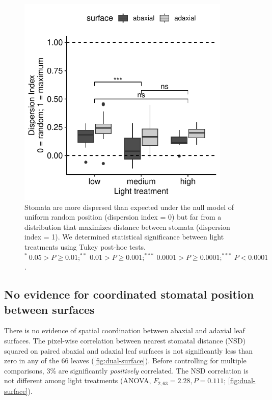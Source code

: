 \documentclass[webpdf,large,modern,unnumsec,namedate]{oup-authoring-template}
\begin{document}
\begin{figure}[ht]
\includegraphics[width=4in]{figures/single-surface.pdf}
\caption{Stomata are more dispersed than expected under the null model of uniform random position (dispersion index = 0) but far from a distribution that maximizes distance between stomata (dispersion index = 1). We determined statistical significance between light treatments using Tukey post-hoc tests. $^*~0.05 > P \ge 0.01; ^{**}~0.01 > P \ge 0.001; ^{***}~0.0001 > P \ge 0.0001; ^{***}~ P <0.0001$.}
\label{fig:single-surface}
\end{figure}

\hypertarget{no-evidence-for-coordinated-stomatal-position-between-surfaces}{%
\subsection{No evidence for coordinated stomatal position between
surfaces}\label{no-evidence-for-coordinated-stomatal-position-between-surfaces}}

There is no evidence of spatial coordination between abaxial and adaxial
leaf surfaces. The pixel-wise correlation between nearest stomatal
distance (NSD) squared on paired abaxial and adaxial leaf surfaces is
not significantly less than zero in any of the 66 leaves
(\autoref{fig:dual-surface}). Before controlling for multiple
comparisons, 3\% are significantly \emph{positively} correlated. The NSD
correlation is not different among light treatments (ANOVA,
\(F_{2,63} = 2.28, P = 0.111\); \autoref{fig:dual-surface}).
\end{document}
